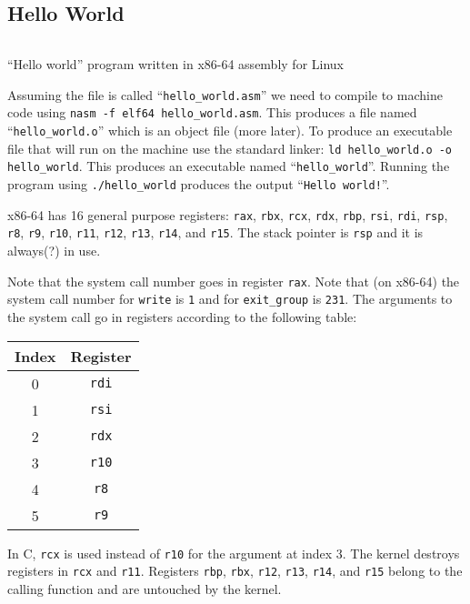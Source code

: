 \subsection{Hello World}

\begin{listing}[H]
  \inputminted[frame=lines]{asm}{code/hello_world.asm}
  \caption{``Hello world'' program written in x86-64 assembly for Linux}
  \label{lst:hello-world-asm}
\end{listing}

Assuming the file is called ``\texttt{hello_world.asm}'' we need to
compile to machine code using \texttt{nasm -f elf64
  hello_world.asm}. This produces a file named
``\texttt{hello_world.o}'' which is an object file (more later). To
produce an executable file that will run on the machine use the standard linker:
\texttt{ld hello_world.o -o hello_world}. This produces an
executable named ``\texttt{hello_world}''. Running the program
using \texttt{./hello_world} produces the output
``\texttt{Hello world!}''.

x86-64 has 16 general purpose registers: \texttt{rax},
\texttt{rbx}, \texttt{rcx}, \texttt{rdx},
\texttt{rbp}, \texttt{rsi}, \texttt{rdi},
\texttt{rsp}, \texttt{r8}, \texttt{r9},
\texttt{r10}, \texttt{r11}, \texttt{r12},
\texttt{r13}, \texttt{r14}, and \texttt{r15}. The
stack pointer is \texttt{rsp} and it is always(?) in use.

Note that the system call number goes in register \texttt{rax}. Note
that (on x86-64) the system call number for \texttt{write} is
\texttt{1} and for \texttt{exit_group} is \texttt{231}. The arguments
to the system call go in registers according to the following table:

{\ttfamily\begin{tabular}{c c}
  \hline
  Index & Register \\
  \hline
  0 & \texttt{rdi} \\
  1 & \texttt{rsi} \\
  2 & \texttt{rdx} \\
  3 & \texttt{r10} \\
  4 & \texttt{r8} \\
  5 & \texttt{r9} \\
\end{tabular}}

In C, \texttt{rcx} is used instead of \texttt{r10} for the
argument at index 3. The kernel destroys registers in \texttt{rcx} and
\texttt{r11}. Registers \texttt{rbp}, \texttt{rbx},
\texttt{r12}, \texttt{r13}, \texttt{r14}, and
\texttt{r15} belong to the calling function and are untouched by the
kernel.
